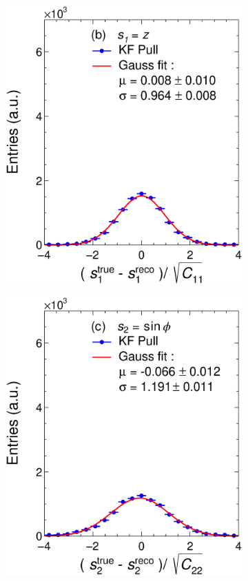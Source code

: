 \begin{figure}[t]
\begin{subfigure}{0.32\textwidth}
         \includegraphics[width=\textwidth]{figures/ch4-KF_NDGArLite/MC/ILRM+KF/UnitKFEnd_p1.eps}
         \caption{}
         \label{fig:resp1KF_GArLite_ILRM+KF}
     \end{subfigure}
    \begin{subfigure}{0.32\textwidth}
         \centering
         \includegraphics[width=\textwidth]{figures/ch4-KF_NDGArLite/MC/ILRM+KF/UnitKFEnd_p2.eps}

\end{subfigure}
\end{figure}
